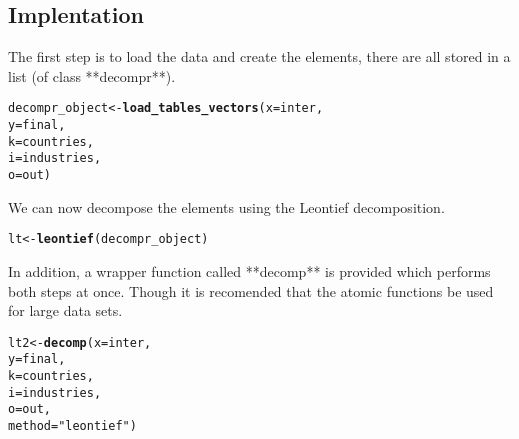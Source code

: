 \documentclass{article}\usepackage[]{graphicx}\usepackage[]{color}
\makeatletter
\newcommand{\hlstr}[1]{\textcolor[rgb]{0.192,0.494,0.8}{#1}}%
\newcommand{\hlstd}[1]{\textcolor[rgb]{0.345,0.345,0.345}{#1}}%
\newcommand{\hlkwb}[1]{\textcolor[rgb]{0.69,0.353,0.396}{#1}}%
\newcommand{\hlkwc}[1]{\textcolor[rgb]{0.333,0.667,0.333}{#1}}%
\newcommand{\hlkwd}[1]{\textcolor[rgb]{0.737,0.353,0.396}{\textbf{#1}}}%
\newenvironment{kframe}{%
 \def\at@end@of@kframe{}%
 \ifinner\ifhmode%
  \def\at@end@of@kframe{\end{minipage}}%
  \begin{minipage}{\columnwidth}%
 \fi\fi%
 \def\FrameCommand##1{\hskip\@totalleftmargin \hskip-\fboxsep
 \colorbox{shadecolor}{##1}\hskip-\fboxsep
     \hskip-\linewidth \hskip-\@totalleftmargin \hskip\columnwidth}%
 \MakeFramed {\advance\hsize-\width
   \@totalleftmargin\z@ \linewidth\hsize
   \@setminipage}}%
 {\par\unskip\endMakeFramed%
 \at@end@of@kframe}
\newenvironment{knitrout}{}{} %
\makeatother
\begin{document}
\subsection{Implentation}
The first step is to load the data and create the elements, there are all stored in a list (of class **decompr**).

\begin{knitrout}
\color{fgcolor}\begin{kframe}
\begin{alltt}
\hlstd{decompr_object} \hlkwb{<-} \hlkwd{load_tables_vectors}\hlstd{(} \hlkwc{x} \hlstd{= inter,}
                                       \hlkwc{y} \hlstd{= final,}
                                       \hlkwc{k} \hlstd{= countries,}
                                       \hlkwc{i} \hlstd{= industries,}
                                       \hlkwc{o} \hlstd{= out         )}
\end{alltt}
\end{kframe}
\end{knitrout}

We can now decompose the elements using the Leontief decomposition.
\begin{knitrout}
\color{fgcolor}\begin{kframe}
\begin{alltt}
\hlstd{lt} \hlkwb{<-} \hlkwd{leontief}\hlstd{( decompr_object )}
\end{alltt}
\end{kframe}
\end{knitrout}


In addition, a wrapper function called **decomp** is provided which performs both steps at once.
Though it is recomended that the atomic functions be used for large data sets.

\begin{knitrout}
\color{fgcolor}\begin{kframe}
\begin{alltt}
\hlstd{lt2} \hlkwb{<-} \hlkwd{decomp}\hlstd{(} \hlkwc{x} \hlstd{= inter,}
               \hlkwc{y} \hlstd{= final,}
               \hlkwc{k} \hlstd{= countries,}
               \hlkwc{i} \hlstd{= industries,}
               \hlkwc{o} \hlstd{= out,}
               \hlkwc{method} \hlstd{=} \hlstr{"leontief"} \hlstd{)}
\end{alltt}
\end{kframe}
\end{knitrout}
\end{document}
